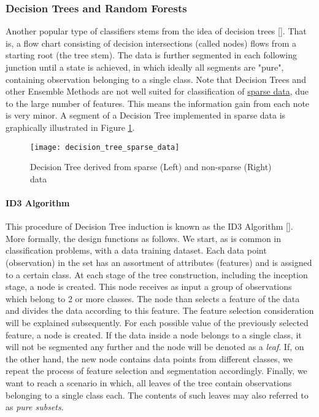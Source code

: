 \subsubsection{Decision Trees and Random Forests}
	Another popular type of classifiers stems from the idea of decision trees [\cite{quinlan2014c4}]. That is, a flow chart consisting of decision intersections (called nodes) flows from a starting root (the tree stem). The data is further segmented in each following junction until a state is achieved, in which ideally all segments are "pure", containing observation belonging to a single class. Note that Decision Trees and other Ensemble Methods are not well suited for classification of \hyperref[data_sparsity]{sparse data}, due to the large number of features. This means the information gain from each note is very minor. A segment of a Decision Tree implemented in sparse data is graphically illustrated in Figure \ref{fig:rand_forest_sparse}.
	
	\begin{figure}[h]
		\centering
		\texttt{[image: decision\_tree\_sparse\_data]}
		\captionsetup{width=0.8\textwidth}
		\caption[Decision Tree with Sparse Data]{Decision Tree derived from sparse (Left) and non-sparse (Right) data}
		\label{fig:rand_forest_sparse}
	\end{figure}
		
	\paragraph{ID3 Algorithm} 
		This procedure of Decision Tree induction is known as the ID3 Algorithm [\cite{quinlan1986induction}]. More formally, the design functions as follows. We start, as is common in classification problems, with a data training dataset. Each data point (observation) in the set has an assortment of attributes (features) and is assigned to a certain class. At each stage of the tree construction, including the inception stage, a node is created. This node receives as input a group of observations which belong to 2 or more classes. The node than selects a feature of the data and divides the data according to this feature. The feature selection consideration will be explained subsequently. For each possible value of the previously selected feature, a node is created. If the data inside a node belongs to a single class, it will not be segmented any further and the node will be denoted as a \textit{leaf}. If, on the other hand, the new node contains data points from different classes, we repeat the process of feature selection and segmentation accordingly. Finally, we want to reach a scenario in which, all leaves of the tree contain observations belonging to a single class each. The contents of such leaves may also referred to as \textit{pure subsets}.
		
